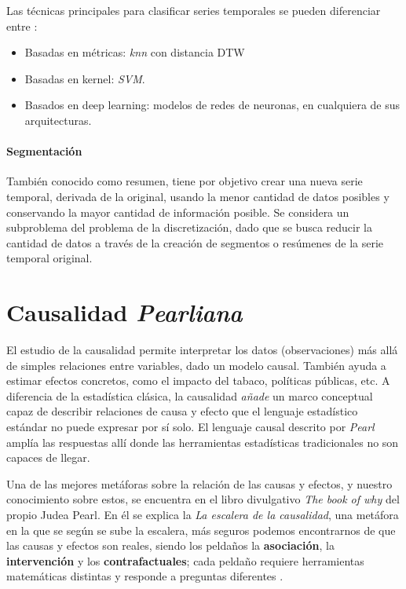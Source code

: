 \documentclass[12pt]{report} %
\begin{document}
Las técnicas principales para clasificar series temporales se pueden diferenciar entre \cite{faouzi:hal-03558165}:
\begin{itemize}
    \item Basadas en métricas: \textit{knn} con distancia DTW
    \item Basadas en kernel: \textit{SVM}.
    \item Basados en deep learning: modelos de redes de neuronas, en cualquiera de sus arquitecturas.
\end{itemize}

\paragraph*{Segmentación}\mbox{}

También conocido como resumen, tiene por objetivo crear una nueva serie temporal, derivada de la original, usando la menor cantidad de datos posibles y conservando la mayor cantidad de información posible. Se considera un subproblema del problema de la discretización, dado que se busca reducir la cantidad de datos a través de la creación de segmentos o resúmenes de la serie temporal original.

\section{Causalidad \textit{Pearliana}}

El estudio de la causalidad permite interpretar los datos (observaciones) más allá de simples relaciones entre variables, dado un modelo causal.
También ayuda a estimar efectos concretos, como el impacto del tabaco, políticas públicas, etc.
A diferencia de la estadística clásica, la causalidad \textit{añade} un marco conceptual capaz de describir relaciones de causa y efecto que el lenguaje estadístico estándar no puede expresar por sí solo. El lenguaje causal descrito por \textit{Pearl} amplía las respuestas allí donde las herramientas estadísticas tradicionales no son capaces de llegar.

Una de las mejores metáforas sobre la relación de las causas y efectos, y nuestro conocimiento sobre estos, se encuentra en el libro divulgativo \textit{The book of why} del propio Judea Pearl. En él se explica la \textit{La escalera de la causalidad}, una metáfora en la que se según se sube la escalera, más seguros podemos encontrarnos de que las causas y efectos son reales, siendo los peldaños la \textbf{asociación}, la \textbf{intervención} y los \textbf{contrafactuales}; cada peldaño requiere herramientas matemáticas distintas y responde a preguntas diferentes \cite{pearl2017}.
\end{document}
